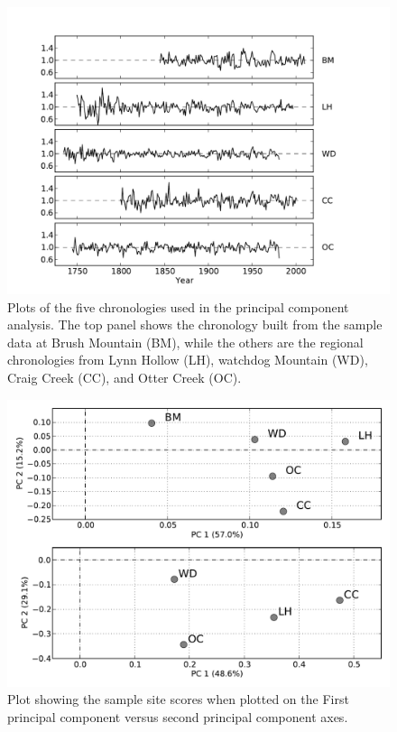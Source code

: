 \begin{figure}
\centering
\includegraphics[width=6in]{figures/stacked_chrons.pdf}
\caption{Plots of the five chronologies used in the principal component analysis. The top panel shows the chronology built from the sample data at Brush Mountain (BM), while the others are the regional chronologies from Lynn Hollow (LH), watchdog Mountain (WD), Craig Creek (CC), and Otter Creek (OC).}
\label{fig:stackedChrons}
\end{figure}

\begin{figure}
\centering
\includegraphics[width=6in]{figures/scoresPlot.pdf}
\caption{Plot showing the sample site scores when plotted on the First principal component versus second principal component axes.}
\label{fig:scores}
\end{figure}

